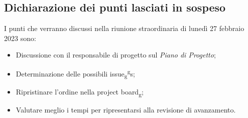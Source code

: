\subsection{Dichiarazione dei punti lasciati in sospeso}
 I punti che verranno discussi nella riunione straordinaria di lunedì 27 febbraio 2023 sono:
 \begin{itemize}
    \item Discussione con il responsabile di progetto sul \textit{Piano di Progetto};
    \item Determinazione delle possibili issue\textsubscript{g}\textsuperscript{g}s;
    \item Ripristinare l'ordine nella project board\textsubscript{g};
    \item Valutare meglio i tempi per ripresentarsi alla revisione di avanzamento.
 \end{itemize}
